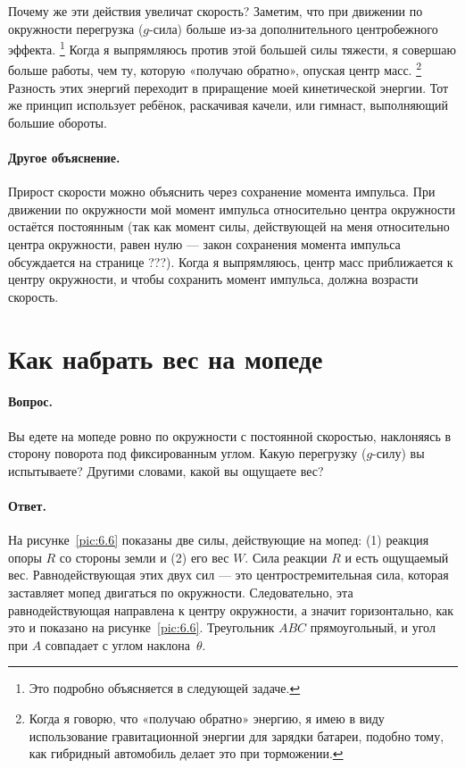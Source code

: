 Почему же эти действия увеличат скорость?
Заметим, что при движении по окружности перегрузка ($g$-сила) больше из-за дополнительного центробежного эффекта.%
\footnote{Это подробно объясняется в следующей задаче.}
Когда я выпрямляюсь против этой большей силы тяжести, я совершаю больше работы, чем ту, которую «получаю обратно», опуская центр масс.%
\footnote{Когда я говорю, что «получаю обратно» энергию, я имею в виду использование гравитационной энергии для зарядки батареи, подобно тому, как гибридный автомобиль делает это при торможении.}
Разность этих энергий переходит в приращение моей кинетической энергии.
Тот же принцип использует ребёнок, раскачивая качели, или гимнаст, выполняющий большие обороты.

\paragraph{Другое объяснение.}
Прирост скорости можно объяснить через сохранение момента импульса.
При движении по окружности мой момент импульса относительно центра окружности остаётся постоянным (так как момент силы, действующей на меня относительно центра окружности, равен нулю --- закон сохранения момента импульса обсуждается на странице ???).
Когда я выпрямляюсь, центр масс приближается к центру окружности, и чтобы сохранить момент импульса, должна возрасти скорость.

\section{Как набрать вес на мопеде}

\paragraph{Вопрос.}
Вы едете на мопеде ровно по окружности с постоянной скоростью, наклоняясь в сторону поворота под фиксированным углом.
Какую перегрузку ($g$-силу) вы испытываете?
Другими словами, какой вы ощущаете вес?

\paragraph{Ответ.}
На рисунке~\ref{pic:6.6} показаны две силы, действующие на мопед:
(1) реакция опоры $R$ со стороны земли и (2) его вес $W$.
Сила реакции $R$ и есть ощущаемый вес.
Равнодействующая этих двух сил — это центростремительная сила, которая заставляет мопед двигаться по окружности.
Следовательно, эта равнодействующая направлена к центру окружности, а значит горизонтально, как это и показано на рисунке~\ref{pic:6.6}.
Треугольник $ABC$ прямоугольный, и угол при $A$ совпадает с углом наклона~$\theta$.

